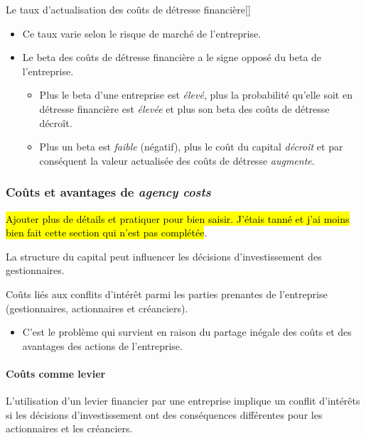 \documentclass[10pt, french]{article}
\begin{document}
\begin{multicols*}{2}
\begin{definitionGENERAL}{Le taux d'actualisation des coûts de détresse financière}[]
\begin{itemize}
	\item	Ce taux varie selon le risque de marché de l'entreprise.
	\item	Le beta des coûts de détresse financière a le signe opposé du beta de l'entreprise.
		\begin{itemize}
		\item	Plus le beta d'une entreprise est \textit{élevé}, plus la probabilité qu'elle soit en détresse financière est \textit{élevée} et plus son beta des coûts de détresse décroît.
		\item	Plus un beta est \textit{faible} (négatif), plus le coût du capital \textit{décroît} et par conséquent la valeur actualisée des coûts de détresse \textit{augmente}.
		\end{itemize}
\end{itemize}
\end{definitionGENERAL}


\columnbreak
\subsubsection{Coûts et avantages de \og \textit{agency costs} \fg{}}
\hl{Ajouter plus de détails et pratiquer pour bien saisir. J'étais tanné et j'ai moins bien fait cette section qui n'est pas complétée}.

La structure du capital peut influencer les décisions d'investissement des gestionnaires. 
\begin{definitionNOHFILL}
Coûts liés aux conflits d'intérêt parmi les parties prenantes de l'entreprise (gestionnaires, actionnaires et créanciers). 
\begin{itemize}
	\item	C'est le problème qui survient en raison du partage inégale des coûts et des avantages des actions de l'entreprise.
\end{itemize}
\end{definitionNOHFILL}


\paragraph{Coûts comme levier}	L'utilisation d'un levier financier par une entreprise implique un conflit d'intérêts si les décisions d'investissement ont des conséquences différentes pour les actionnaires et les créanciers.	\\


\end{multicols*}
\end{document}
